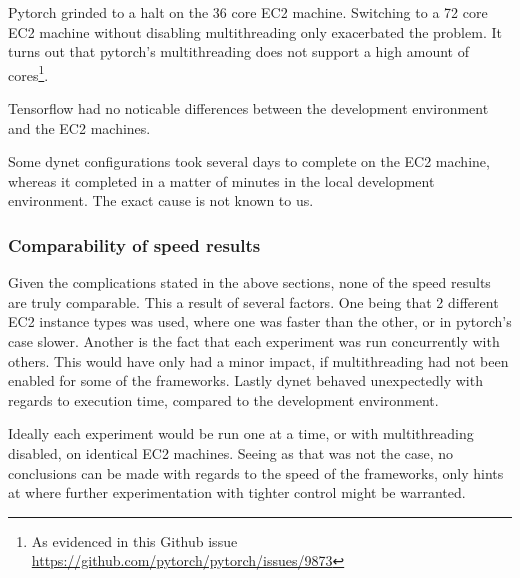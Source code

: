 Pytorch grinded to a halt on the 36 core EC2 machine. Switching to a 72 core EC2
machine without disabling multithreading only exacerbated the problem. It turns
out that pytorch's multithreading does not support a high amount of
cores\footnote{As evidenced in this Github issue \url{https://github.com/pytorch/pytorch/issues/9873}}.

Tensorflow had no noticable differences between the development environment and
the EC2 machines.

Some dynet configurations took several days to complete on the EC2 machine,
whereas it completed in a matter of minutes in the local development
environment. The exact cause is not known to us. 

\subsubsection{Comparability of speed results}

Given the complications stated in the above sections, none of the speed results
are truly comparable. This a result of several factors.
One being that 2 different EC2 instance types was used, where one was faster
than the other, or in pytorch's case slower.
Another is the fact that each experiment was run concurrently with others. This
would have only had a minor impact, if multithreading had not been enabled for
some of the frameworks.
Lastly dynet behaved unexpectedly with regards to execution time, compared to the
development environment.

Ideally each experiment would be run one at a time, or with multithreading
disabled, on identical EC2 machines. Seeing as that was not the case, no
conclusions can be made with regards to the speed of the frameworks, only hints
at where further experimentation with tighter control might be warranted.
